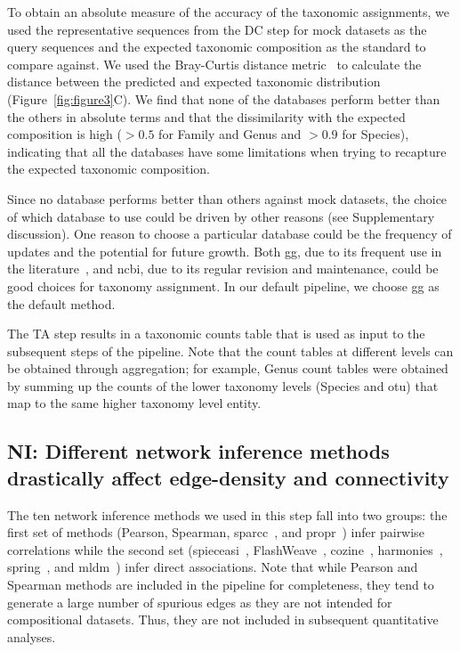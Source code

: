   To obtain an absolute measure of the accuracy of the taxonomic assignments, we used the representative sequences from the DC step for mock datasets as the query sequences and the expected taxonomic composition as the standard to compare against.
  We used the Bray-Curtis distance metric~\cite{virtanenSciPyFundamentalAlgorithms2020} to calculate the distance between the predicted and expected taxonomic distribution (Figure~\ref{fig:figure3}C).
  We find that none of the databases perform better than the others in absolute terms and that the dissimilarity with the expected composition is high ($>0.5$ for Family and Genus and $>0.9$ for Species), indicating that all the databases have some limitations when trying to recapture the expected taxonomic composition.

  Since no database performs better than others against mock datasets, the choice of which database to use could be driven by other reasons (see Supplementary discussion).
  One reason to choose a particular database could be the frequency of updates and the potential for future growth.
  Both \ac{gg}, due to its frequent use in the literature~\cite{Balvociute2017}, and \ac{ncbi}, due to its regular revision and maintenance, could be good choices for taxonomy assignment.
  In our default pipeline, we choose \ac{gg} as the default method.

  The TA step results in a taxonomic counts table that is used as input to the subsequent steps of the pipeline.
  Note that the count tables at different levels can be obtained through aggregation; for example, Genus count tables were obtained by summing up the counts of the lower taxonomy levels (Species and \ac{otu}) that map to the same higher taxonomy level entity.

  \FloatBarrier

  \subsection*{NI: Different network inference methods drastically affect edge-density and connectivity}

   The ten network inference methods we used in this step fall into two groups: the first set of methods (Pearson, Spearman, \acs{sparcc}~\cite{Friedman2012,Watts2018}, and propr~\cite{quinnProprRpackageIdentifying2017}) infer pairwise correlations while the second set (\acs{spieceasi}~\cite{Kurtz2015}, FlashWeave~\cite{tackmannRapidInferenceDirect2019}, \acs{cozine}~\cite{haCompositionalZeroinflatedNetwork2020a}, \acs{harmonies}~\cite{jiangHARMONIESHybridApproach2020}, \acs{spring}~\cite{yoonMicrobialNetworksSPRING2019}, and \acs{mldm}~\cite{Yang2017}) infer direct associations.
   Note that while Pearson and Spearman methods are included in the pipeline for completeness, they tend to generate a large number of spurious edges as they are not intended for compositional datasets.
   Thus, they are not included in subsequent quantitative analyses.

